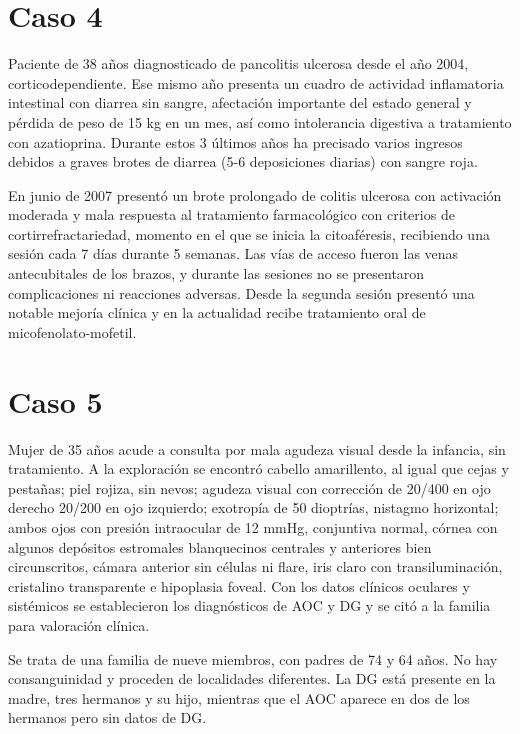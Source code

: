 \section{Caso 4}\label{anexo:texto_caso_4}

Paciente de 38 años diagnosticado de pancolitis ulcerosa desde el año 2004, corticodependiente. Ese
mismo año presenta un cuadro de actividad inflamatoria intestinal con diarrea sin sangre,
afectación importante del estado general y pérdida de peso de 15 kg en un mes, así como
intolerancia digestiva a tratamiento con azatioprina. Durante estos 3 últimos años ha precisado
varios ingresos debidos a graves brotes de diarrea (5-6 deposiciones diarias) con sangre roja.

En junio de 2007 presentó un brote prolongado de colitis ulcerosa con activación moderada y mala
respuesta al tratamiento farmacológico con criterios de cortirrefractariedad, momento en el que se
inicia la citoaféresis, recibiendo una sesión cada 7 días durante 5 semanas. Las vías de acceso
fueron las venas antecubitales de los brazos, y durante las sesiones no se presentaron
complicaciones ni reacciones adversas. Desde la segunda sesión presentó una notable mejoría clínica
y en la actualidad recibe tratamiento oral de micofenolato-mofetil.

\section{Caso 5}\label{anexo:texto_caso_5}

Mujer de 35 años acude a consulta por mala agudeza visual desde la infancia, sin tratamiento. A la
exploración se encontró cabello amarillento, al igual que cejas y pestañas; piel rojiza, sin nevos;
agudeza visual con corrección de 20/400 en ojo derecho 20/200 en ojo izquierdo; exotropía de 50
dioptrías, nistagmo horizontal; ambos ojos con presión intraocular de 12 mmHg, conjuntiva normal,
córnea con algunos depósitos estromales blanquecinos centrales y anteriores bien circunscritos,
cámara anterior sin células ni flare, iris claro con transiluminación, cristalino transparente e
hipoplasia foveal. Con los datos clínicos oculares y sistémicos se establecieron los diagnósticos
de AOC y DG y se citó a la familia para valoración clínica.

Se trata de una familia de nueve miembros, con padres de 74 y 64 años. No hay consanguinidad y
proceden de localidades diferentes. La DG está presente en la madre, tres hermanos y su hijo,
mientras que el AOC aparece en dos de los hermanos pero sin datos de DG.


